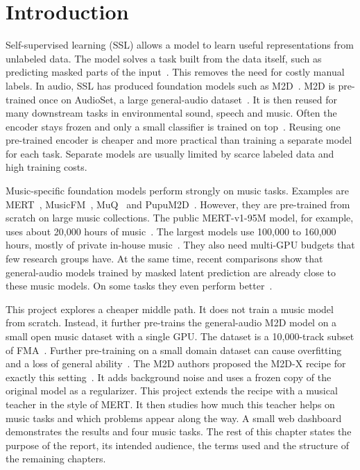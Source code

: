 \documentclass{FastFyp}
\begin{document}
\pagebreak
{\listoffigures}	%
\pagebreak
{\listoftables} %

\mainmatter


\chapter{Introduction}
\label{ch:intro}
Self-supervised learning (SSL) allows a model to learn useful representations from unlabeled data. The model solves a task built from the data itself, such as predicting masked parts of the input~\cite{ref:He:2022mae,ref:Baevski:2022data2vec}. This removes the need for costly manual labels. In audio, SSL has produced foundation models such as M2D~\cite{ref:Niizumi:2023m2d,ref:Niizumi:2024m2dx}. M2D is pre-trained once on AudioSet, a large general-audio dataset~\cite{ref:Gemmeke:2017audioset}. It is then reused for many downstream tasks in environmental sound, speech and music. Often the encoder stays frozen and only a small classifier is trained on top~\cite{ref:Turian:2022hear}. Reusing one pre-trained encoder is cheaper and more practical than training a separate model for each task. Separate models are usually limited by scarce labeled data and high training costs.

Music-specific foundation models perform strongly on music tasks. Examples are MERT~\cite{ref:Li:2024mert}, MusicFM~\cite{ref:Won:2024musicfm}, MuQ~\cite{ref:Zhu:2025muq} and PupuM2D~\cite{ref:Gu:2026pupum2d}. However, they are pre-trained from scratch on large music collections. The public MERT-v1-95M model, for example, uses about 20,000 hours of music~\cite{ref:MERTCard}. The largest models use 100,000 to 160,000 hours, mostly of private in-house music~\cite{ref:Li:2024mert,ref:Won:2024musicfm,ref:Gu:2026pupum2d}. They also need multi-GPU budgets that few research groups have. At the same time, recent comparisons show that general-audio models trained by masked latent prediction are already close to these music models. On some tasks they even perform better~\cite{ref:Quelennec:2025matpacpp,ref:Gu:2026pupum2d}.

This project explores a cheaper middle path. It does not train a music model from scratch. Instead, it further pre-trains the general-audio M2D model on a small open music dataset with a single GPU. The dataset is a 10,000-track subset of FMA~\cite{ref:Defferrard:2017fma}. Further pre-training on a small domain dataset can cause overfitting and a loss of general ability~\cite{ref:Zhang:2025sonar}. The M2D authors proposed the M2D-X recipe for exactly this setting~\cite{ref:Niizumi:2024m2dx}. It adds background noise and uses a frozen copy of the original model as a regularizer. This project extends the recipe with a musical teacher in the style of MERT. It then studies how much this teacher helps on music tasks and which problems appear along the way. A small web dashboard demonstrates the results and four music tasks. The rest of this chapter states the purpose of the report, its intended audience, the terms used and the structure of the remaining chapters.
\end{document}
